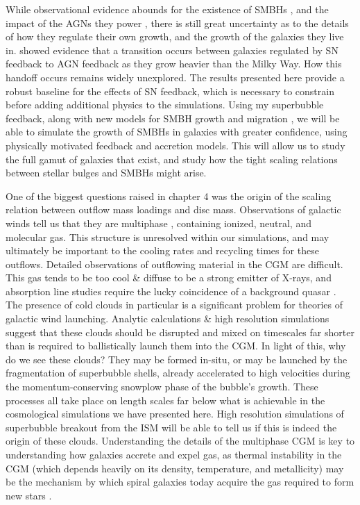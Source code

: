 While observational evidence abounds for the existence of SMBHs
\citep{Kormendy2013}, and the impact of the AGNs they power
\citep{Veilleux2005}, there is still great uncertainty as to the details of how
they regulate their own growth, and the growth of the galaxies they live in.
\citet{Keller2016a} showed evidence that a transition occurs between galaxies
regulated by SN feedback to AGN feedback as they grow heavier than the Milky
Way.  How this handoff occurs remains widely unexplored.  The results presented
here provide a robust baseline for the effects of SN feedback, which is
necessary to constrain before adding additional physics to the simulations.
Using my superbubble feedback, along with new models for SMBH growth
\citep{Hopkins2010} and migration \citep{Tremmel2015}, we will be able to
simulate the growth of SMBHs in galaxies with greater confidence, using
physically motivated feedback and accretion models.  This will allow us to study
the full gamut of galaxies that exist, and study how the tight scaling relations
between stellar bulges and SMBHs might arise.

One of the biggest questions raised in chapter 4 was the origin of the scaling
relation between outflow mass loadings and disc mass.  Observations of galactic
winds tell us that they are multiphase \citep{Stark1984,Wakker1997,Weiner2009},
containing ionized, neutral, and molecular gas.  This structure is unresolved
within our simulations, and may ultimately be important to the cooling rates and
recycling times for these outflows.  Detailed observations of outflowing
material in the CGM are difficult. This gas tends to be too cool \& diffuse to
be a strong emitter of X-rays, and absorption line studies require the lucky
coincidence of a background quasar \citep{Weiner2009}.  The presence of cold
clouds in particular is a significant problem for theories of galactic wind
launching.  Analytic calculations \& high resolution
simulations suggest that these clouds should be disrupted and mixed on
timescales far shorter than is required to ballistically launch them into the
CGM.  In light of this, why do we see these clouds?  They may be formed in-situ,
or may be launched by the fragmentation of superbubble shells, already
accelerated to high velocities during the momentum-conserving snowplow phase of
the bubble's growth.  These processes all take place on length scales far below
what is achievable in the cosmological simulations we have presented here.
High resolution simulations of superbubble breakout from
the ISM will be able to tell us if this is indeed the origin of these clouds.
Understanding the details of the multiphase CGM is key to
understanding how galaxies accrete and expel gas, as thermal instability in the
CGM (which depends heavily on its density, temperature, and metallicity) may be
the mechanism by which spiral galaxies today acquire the gas required to
form new stars \citep{Marasco2012}.  

